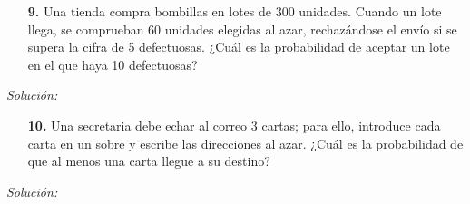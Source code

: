 \documentclass[11pt,a4paper]{article}
\theoremstyle{definition}
\begin{document}


\pagebreak

\begin{itemize}
	\item[\textbf{9.}] Una tienda compra bombillas en lotes de 300 unidades. Cuando un lote llega, se comprueban 60 unidades elegidas al azar, rechazándose el envío si se supera la cifra de 5 defectuosas. ¿Cuál es la probabilidad de aceptar un lote en el que haya 10 defectuosas?
\end{itemize}

{\color{grey}\hrulefill}

\emph{Solución:}

 



\pagebreak

\begin{itemize}
	\item[\textbf{10.}] Una secretaria debe echar al correo 3 cartas; para ello, introduce cada carta en un sobre y escribe las direcciones al azar. ¿Cuál es la probabilidad de que al menos una carta llegue a su destino?

\end{itemize}

{\color{grey}\hrulefill}

\emph{Solución:}
\end{document}
